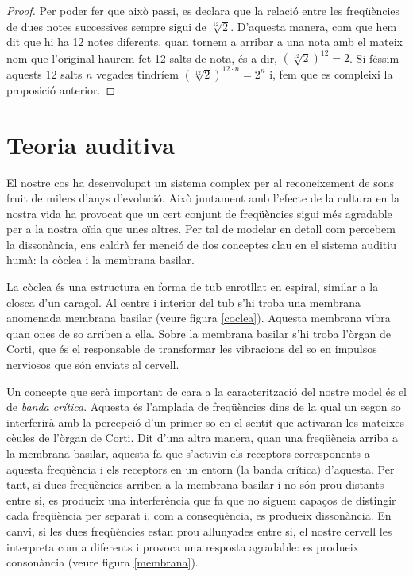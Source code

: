 \documentclass{article}
\theoremstyle{math}
\newcommand{\0}{\ensuremath{\vb{0}}}
\begin{document}
\begin{proof}
    Per poder fer que això passi, es declara que la relació entre les freqüències de dues notes successives sempre sigui de $\sqrt[12]{2}$\footnotemark. D'aquesta manera, com que hem dit que hi ha 12 notes diferents, quan tornem a arribar a una nota amb el mateix nom que l'original haurem fet 12 salts de nota, és a dir, $\left(\sqrt[12]{2}\right)^{12} = 2$. Si féssim aquests 12 salts $n$ vegades tindríem $\left(\sqrt[12]{2}\right)^{12\cdot n} = 2^n$ i, fem que es compleixi la proposició anterior. 
\end{proof}
\section{Teoria auditiva}\label{teoria_auditiva}
El nostre cos ha desenvolupat un sistema complex per al reconeixement de sons fruit de milers d'anys d'evolució. Això juntament amb l'efecte de la cultura en la nostra vida ha provocat que un cert conjunt de freqüències sigui més agradable per a la nostra oïda que unes altres. Per tal de modelar en detall com percebem la dissonància, ens caldrà fer menció de dos conceptes clau en el sistema auditiu humà: la còclea i la membrana basilar. \par
La còclea és una estructura en forma de tub enrotllat en espiral, similar a la closca d'un caragol. Al centre i interior del tub s'hi troba una membrana anomenada membrana basilar (veure figura \ref{coclea}). Aquesta membrana vibra quan ones de so arriben a ella. Sobre la membrana basilar s'hi troba l'òrgan de Corti, que és el responsable de transformar les vibracions del so en impulsos nerviosos que són enviats al cervell.\par
Un concepte que serà important de cara a la caracterització del nostre model és el de \textit{banda crítica}. Aquesta és l'amplada de freqüències dins de la qual un segon so interferirà amb la percepció d'un primer so en el sentit que activaran les mateixes cè\lgem ules de l'òrgan de Corti. Dit d'una altra manera, quan una freqüència arriba a la membrana basilar, aquesta fa que s'activin els receptors corresponents a aquesta freqüència i els receptors en un entorn (la banda crítica) d'aquesta. Per tant, si dues freqüències arriben a la membrana basilar i no són prou distants entre si, es produeix una interferència que fa que no siguem capaços de distingir cada freqüència per separat i, com a conseqüència, es produeix dissonància. En canvi, si les dues freqüències estan prou allunyades entre si, el nostre cervell les interpreta com a diferents i provoca una resposta agradable: es produeix consonància (veure figura \ref{membrana}).\par
\end{document}
